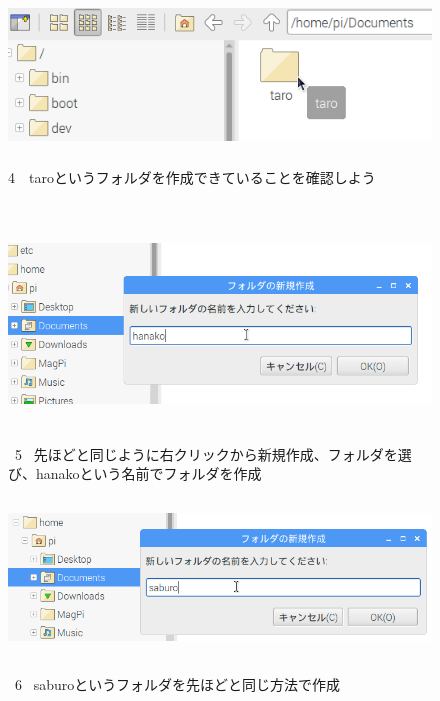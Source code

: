 \documentclass[a4paper,12pt]{jarticle}
\begin{document}
\begin{figure}[ht]
\centering
\includegraphics[width=12.659cm,height=3.972cm]{textbook-img040.png}
\begin{minipage}{\textwidth}
4　taroというフォルダを作成できていることを確認しよう
\end{minipage}

\end{figure}
\clearpage
\begin{figure}
	\\
	\vspace{10mm}
\centering
\includegraphics[width=14.289cm,height=5.431cm]{textbook-img041.png}
\begin{minipage}{\textwidth}
\ 5
\ 先ほどと同じように右クリックから新規作成、フォルダを選び、hanakoという名前でフォルダを作成
\end{minipage}

\centering
\includegraphics[width=13.884cm,height=4.189cm]{textbook-img042.png}
\begin{minipage}{\textwidth}
\ 6
\ saburoというフォルダを先ほどと同じ方法で作成
\end{minipage}


\end{figure}
\end{document}
